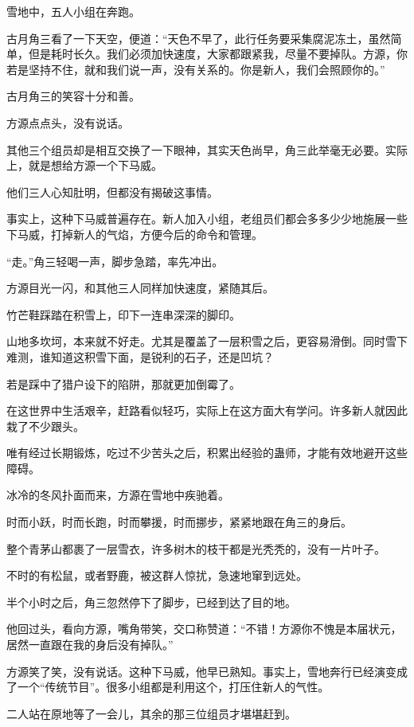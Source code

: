 
\begin{this_body}

雪地中，五人小组在奔跑。

古月角三看了一下天空，便道：“天色不早了，此行任务要采集腐泥冻土，虽然简单，但是耗时长久。我们必须加快速度，大家都跟紧我，尽量不要掉队。方源，你若是坚持不住，就和我们说一声，没有关系的。你是新人，我们会照顾你的。”

古月角三的笑容十分和善。

方源点点头，没有说话。

其他三个组员却是相互交换了一下眼神，其实天色尚早，角三此举毫无必要。实际上，就是想给方源一个下马威。

他们三人心知肚明，但都没有揭破这事情。

事实上，这种下马威普遍存在。新人加入小组，老组员们都会多多少少地施展一些下马威，打掉新人的气焰，方便今后的命令和管理。

“走。”角三轻喝一声，脚步急踏，率先冲出。

方源目光一闪，和其他三人同样加快速度，紧随其后。

竹芒鞋踩踏在积雪上，印下一连串深深的脚印。

山地多坎坷，本来就不好走。尤其是覆盖了一层积雪之后，更容易滑倒。同时雪下难测，谁知道这积雪下面，是锐利的石子，还是凹坑？

若是踩中了猎户设下的陷阱，那就更加倒霉了。

在这世界中生活艰辛，赶路看似轻巧，实际上在这方面大有学问。许多新人就因此栽了不少跟头。

唯有经过长期锻炼，吃过不少苦头之后，积累出经验的蛊师，才能有效地避开这些障碍。

冰冷的冬风扑面而来，方源在雪地中疾驰着。

时而小跃，时而长跑，时而攀援，时而挪步，紧紧地跟在角三的身后。

整个青茅山都裹了一层雪衣，许多树木的枝干都是光秃秃的，没有一片叶子。

不时的有松鼠，或者野鹿，被这群人惊扰，急速地窜到远处。

半个小时之后，角三忽然停下了脚步，已经到达了目的地。

他回过头，看向方源，嘴角带笑，交口称赞道：“不错！方源你不愧是本届状元，居然一直跟在我的身后没有掉队。”

方源笑了笑，没有说话。这种下马威，他早已熟知。事实上，雪地奔行已经演变成了一个“传统节目”。很多小组都是利用这个，打压住新人的气性。

二人站在原地等了一会儿，其余的那三位组员才堪堪赶到。


\end{this_body}
